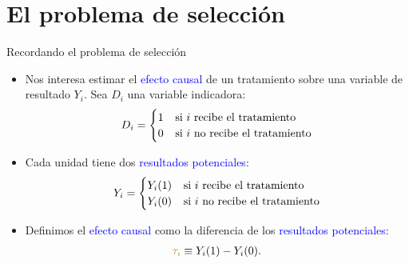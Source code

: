 \documentclass[10pt, xcolor=dvipsnames]{beamer}
\begin{document}
\section{El problema de selección}

\begin{frame}{Recordando el problema de selección}
\begin{itemize}
    \item Nos interesa estimar el \textcolor{blue}{efecto causal} de un tratamiento sobre una variable de resultado \(Y_i\). Sea $D_i$ una variable indicadora: 
    \begin{align*}
        D_i = 
        \begin{cases}
            1 &\hspace{0.5pt} \text{si $i$ recibe el tratamiento}\\
            0 &\hspace{0.5pt} \text{si $i$ no recibe el tratamiento}
        \end{cases}
    \end{align*}
    \item Cada unidad tiene dos \textcolor{blue}{resultados potenciales}:
    \begin{align*}
        Y_i = 
        \begin{cases}
            Y_i(1) &\hspace{0.5pt} \text{si $i$ recibe el tratamiento}\\
            Y_i(0) &\hspace{0.5pt} \text{si $i$ no recibe el tratamiento}
        \end{cases}
    \end{align*}
    \item Definimos el \textcolor{blue}{efecto causal} como la diferencia de los \textcolor{blue}{resultados potenciales}: \vspace{-0.2cm}
    \begin{align*}
    	\textcolor{brown}{\tau_i} \equiv Y_i(1)-Y_i(0).
    \end{align*}
\end{itemize}
\end{frame}
\end{document}
